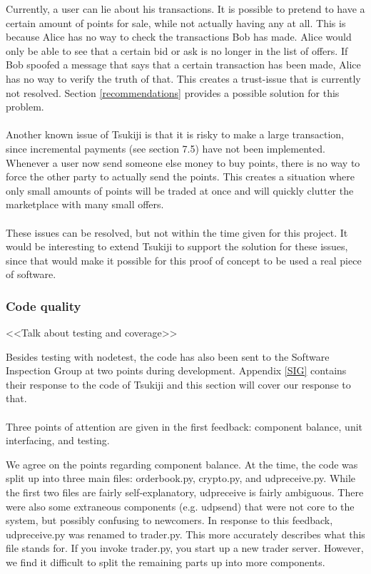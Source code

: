 Currently, a user can lie about his transactions.
It is possible to pretend to have a certain amount of points for sale, while not actually having any at all.
This is because Alice has no way to check the transactions Bob has made.
Alice would only be able to see that a certain bid or ask is no longer in the list of offers.
If Bob spoofed a message that says that a certain transaction has been made, Alice has no way to verify the truth of that.
This creates a trust-issue that is currently not resolved.
Section \ref{recommendations} provides a possible solution for this problem.\\
\\
Another known issue of Tsukiji is that it is risky to make a large transaction, since incremental payments (see section 7.5) have not been implemented.
Whenever a user now send someone else money to buy points, there is no way to force the other party to actually send the points.
This creates a situation where only small amounts of points will be traded at once and will quickly clutter the marketplace with many small offers.\\
\\
These issues can be resolved, but not within the time given for this project.
It would be interesting to extend Tsukiji to support the solution for these issues, since that would make it possible for this proof of concept to be used a real piece of software.



\subsubsection{Code quality}
<<Talk about testing and coverage>>

Besides testing with nodetest, the code has also been sent to the Software Inspection Group at two points during development. Appendix \ref{SIG} contains their response to the code of Tsukiji and this section will cover our response to that.\\
\\
Three points of attention are given in the first feedback: component balance, unit interfacing, and testing.

We agree on the points regarding component balance.
At the time, the code was split up into three main files: orderbook.py, crypto.py, and udpreceive.py.
While the first two files are fairly self-explanatory, udpreceive is fairly ambiguous.
There were also some extraneous components (e.g. udpsend) that were not core to the system, but possibly confusing to newcomers.
In response to this feedback, udpreceive.py was renamed to trader.py.
This more accurately describes what this file stands for.
If you invoke trader.py, you start up a new trader server.
However, we find it difficult to split the remaining parts up into more components.

